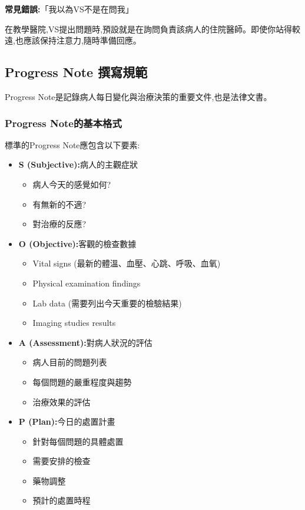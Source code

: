\documentclass[12pt,a4paper]{article}
\begin{document}
\begin{importantbox}
\textbf{常見錯誤:}「我以為VS不是在問我」

在教學醫院,VS提出問題時,預設就是在詢問負責該病人的住院醫師。即使你站得較遠,也應該保持注意力,隨時準備回應。
\end{importantbox}

\subsection{Progress Note 撰寫規範}

Progress Note是記錄病人每日變化與治療決策的重要文件,也是法律文書。

\subsubsection{Progress Note的基本格式}

標準的Progress Note應包含以下要素:

\begin{itemize}[leftmargin=*]
\item \textbf{S (Subjective):}病人的主觀症狀
\begin{itemize}
\item 病人今天的感覺如何?
\item 有無新的不適?
\item 對治療的反應?
\end{itemize}

\item \textbf{O (Objective):}客觀的檢查數據
\begin{itemize}
\item Vital signs (最新的體溫、血壓、心跳、呼吸、血氧)
\item Physical examination findings
\item Lab data (需要列出今天重要的檢驗結果)
\item Imaging studies results
\end{itemize}

\item \textbf{A (Assessment):}對病人狀況的評估
\begin{itemize}
\item 病人目前的問題列表
\item 每個問題的嚴重程度與趨勢
\item 治療效果的評估
\end{itemize}

\item \textbf{P (Plan):}今日的處置計畫
\begin{itemize}
\item 針對每個問題的具體處置
\item 需要安排的檢查
\item 藥物調整
\item 預計的處置時程
\end{itemize}
\end{itemize}
\end{document}
